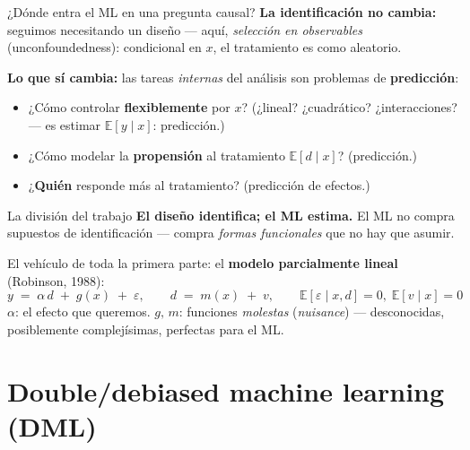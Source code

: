 \documentclass{beamer}
\newcommand{\E}{\mathbb{E}}
\newcommand{\1}{\mathbb{I}}
\begin{document}
\begin{frame}{¿Dónde entra el ML en una pregunta causal?}
\small
\textbf{La identificación no cambia:} seguimos necesitando un diseño --- aquí, \emph{selección en observables} (unconfoundedness): condicional en $x$, el tratamiento es como aleatorio.
\pause

\vspace{0.15cm}
\textbf{Lo que sí cambia:} las tareas \emph{internas} del análisis son problemas de \textbf{predicción}:
\begin{itemize}\itemsep4pt
  \item ¿Cómo controlar \textbf{flexiblemente} por $x$? (¿lineal? ¿cuadrático? ¿interacciones? --- es estimar $\E[y \mid x]$: predicción.)
  \item ¿Cómo modelar la \textbf{propensión} al tratamiento $\E[d \mid x]$? (predicción.)
  \item ¿\textbf{Quién} responde más al tratamiento? (predicción de efectos.)
\end{itemize}
\pause

\vspace{0.15cm}
\begin{block}{La división del trabajo}
\textbf{El diseño identifica; el ML estima.} El ML no compra supuestos de identificación --- compra \emph{formas funcionales} que no hay que asumir.
\end{block}
\pause

\vspace{0.1cm}
El vehículo de toda la primera parte: el \textbf{modelo parcialmente lineal} (Robinson, 1988):
\[ y \;=\; \alpha\, d \;+\; g(x) \;+\; \varepsilon, \qquad d \;=\; m(x) \;+\; v, \qquad \E[\varepsilon \mid x, d] = 0,\; \E[v \mid x] = 0 \]
$\alpha$: el efecto que queremos. $g,\, m$: funciones \emph{molestas} (\emph{nuisance}) --- desconocidas, posiblemente complejísimas, perfectas para el ML.
\end{frame}


\section{Double/debiased machine learning (DML)}
\begin{frame}[noframenumbering]
\tableofcontents[currentsection]
\end{frame}
\end{document}
